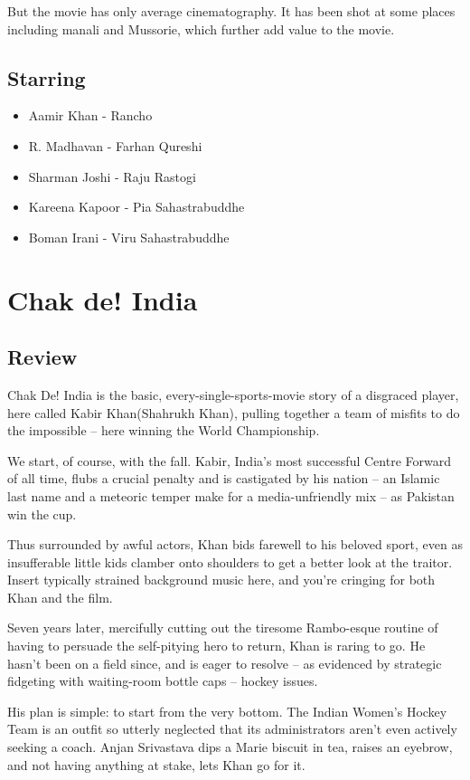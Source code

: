 \documentclass[11pt]{article} %
\begin{document}
But the movie has only average cinematography. It has been shot at some places including manali and Mussorie, which further add value to the movie.

\subsection{Starring}
\begin{itemize}
	\item Aamir Khan - Rancho
	\item R. Madhavan - Farhan Qureshi
	\item Sharman Joshi - Raju Rastogi
	\item Kareena Kapoor - Pia Sahastrabuddhe
	\item Boman Irani - Viru Sahastrabuddhe
\end{itemize}

\section{Chak de! India}
\subsection{Review}
Chak De! India is the basic, every-single-sports-movie story of a disgraced player, here called Kabir Khan(Shahrukh Khan), pulling together a team of misfits to do the impossible -- here winning the World Championship. 

We start, of course, with the fall. Kabir, India's most successful Centre Forward of all time, flubs a crucial penalty and is castigated by his nation -- an Islamic last name and a meteoric temper make for a media-unfriendly mix -- as Pakistan win the cup.

Thus surrounded by awful actors, Khan bids farewell to his beloved sport, even as insufferable little kids clamber onto shoulders to get a better look at the traitor. Insert typically strained background music here, and you're cringing for both Khan and the film.

Seven years later, mercifully cutting out the tiresome Rambo-esque routine of having to persuade the self-pitying hero to return, Khan is raring to go. He hasn't been on a field since, and is eager to resolve -- as evidenced by strategic fidgeting with waiting-room bottle caps -- hockey issues.

His plan is simple: to start from the very bottom. The Indian Women's Hockey Team is an outfit so utterly neglected that its administrators aren't even actively seeking a coach. Anjan Srivastava dips a Marie biscuit in tea, raises an eyebrow, and not having anything at stake, lets Khan go for it.
\end{document}
